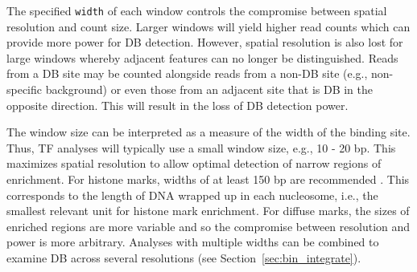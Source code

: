 \documentclass[12pt]{report}
\newcommand{\code}[1]{{\small\texttt{#1}}}
\begin{document}
\begin{center}
\end{center}

The specified \code{width} of each window controls the compromise between spatial resolution and count size. 
Larger windows will yield higher read counts which can provide more power for DB detection. 
However, spatial resolution is also lost for large windows whereby adjacent features can no longer be distinguished. 
Reads from a DB site may be counted alongside reads from a non-DB site (e.g., non-specific background) or even those from an adjacent site that is DB in the opposite direction. 
This will result in the loss of DB detection power.

The window size can be interpreted as a measure of the width of the binding site. 
Thus, TF analyses will typically use a small window size, e.g., 10 - 20 bp.
This maximizes spatial resolution to allow optimal detection of narrow regions of enrichment. 
For histone marks, widths of at least 150 bp are recommended \citep{humburg2011}. 
This corresponds to the length of DNA wrapped up in each nucleosome, i.e., the smallest relevant unit for histone mark enrichment. 
For diffuse marks, the sizes of enriched regions are more variable and so the compromise between resolution and power is more arbitrary. 
Analyses with multiple widths can be combined to examine DB across several resolutions (see Section~\ref{sec:bin_integrate}).
\end{document}
